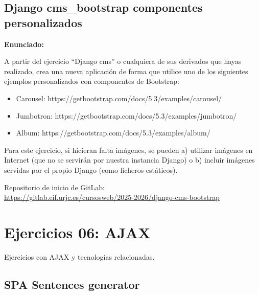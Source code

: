 \subsection{Django cms\_bootstrap componentes personalizados}
\label{subsec:django-cms-bootstrap-3}

\textbf{Enunciado:}

A partir del ejercicio ``Django cms'' o cualquiera de sus derivados que hayas realizado, crea una nueva aplicación de forma que utilice uno de los siguientes ejemplos personalizados con componentes de Bootstrap:

\begin{itemize}
  \item Carousel: https://getbootstrap.com/docs/5.3/examples/carousel/
  \item Jumbotron: https://getbootstrap.com/docs/5.3/examples/jumbotron/
  \item Album: https://getbootstrap.com/docs/5.3/examples/album/
\end{itemize}

Para este ejercicio, si hicieran falta imágenes, se pueden a) utilizar imágenes en Internet (que no se servirán por nuestra instancia Django) o b) incluir imágenes servidas por el propio Django (como ficheros estáticos).

Repositorio de inicio de GitLab: \\
\url{https://gitlab.eif.urjc.es/cursosweb/2025-2026/django-cms-bootstrap}


\section{Ejercicios 06: AJAX}

Ejercicios con AJAX y tecnologías relacionadas.

\subsection{SPA Sentences generator}
\label{subsec:spa-sentences-generator}

